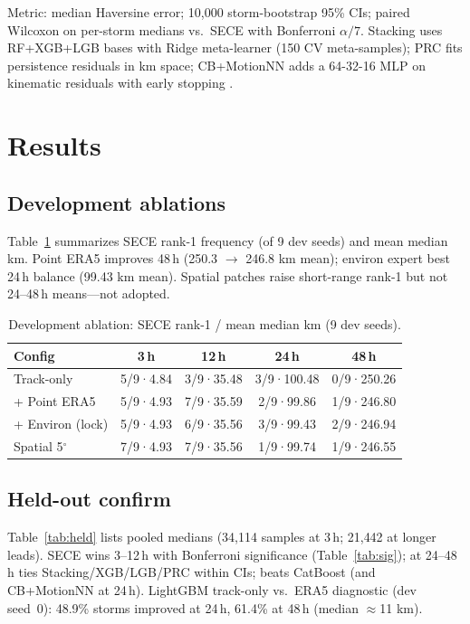\documentclass[conference]{IEEEtran}
\newcommand{\sece}{SECE}
\newcommand{\era}{ERA5}
\newcommand{\km}{\,km}
\begin{document}
Metric: median Haversine error; 10{,}000 storm-bootstrap 95\% CIs; paired Wilcoxon on per-storm medians vs.\ \sece{} with Bonferroni $\alpha/7$.
Stacking uses RF+XGB+LGB bases with Ridge meta-learner (150 CV meta-samples); PRC fits persistence residuals in km space; CB+MotionNN adds a 64-32-16 MLP on kinematic residuals with early stopping \cite{grinsztajn2022,probst2019}.

\section{Results}
\subsection{Development ablations}
Table~\ref{tab:abl} summarizes \sece{} rank-1 frequency (of 9 dev seeds) and mean median \km{}.
Point \era{} improves 48\,h (250.3 $\rightarrow$ 246.8\,\km{} mean); environ expert best 24\,h balance (99.43\,\km{} mean).
Spatial patches raise short-range rank-1 but not 24--48\,h means---not adopted.

\begin{table}[t]
\caption{Development ablation: \sece{} rank-1 / mean median km (9 dev seeds).}
\label{tab:abl}
\centering
\scriptsize
\begin{tabular}{@{}lcccc@{}}
\toprule
Config & 3\,h & 12\,h & 24\,h & 48\,h \\
\midrule
Track-only & 5/9·4.84 & 3/9·35.48 & 3/9·100.48 & 0/9·250.26 \\
+ Point \era{} & 5/9·4.93 & 7/9·35.59 & 2/9·99.86 & 1/9·246.80 \\
+ Environ (lock) & 5/9·4.93 & 6/9·35.56 & 3/9·99.43 & 2/9·246.94 \\
Spatial 5$^\circ$ & 7/9·4.93 & 7/9·35.56 & 1/9·99.74 & 1/9·246.55 \\
\bottomrule
\end{tabular}
\end{table}

\subsection{Held-out confirm}
Table~\ref{tab:held} lists pooled medians (34{,}114 samples at 3\,h; 21{,}442 at longer leads).
\sece{} wins 3--12\,h with Bonferroni significance (Table~\ref{tab:sig}); at 24--48\,h ties Stacking/XGB/LGB/PRC within CIs; beats CatBoost (and CB+MotionNN at 24\,h).
LightGBM track-only vs.\ \era{} diagnostic (dev seed~0): 48.9\% storms improved at 24\,h, 61.4\% at 48\,h (median $\approx$11\,\km{}).
\end{document}
